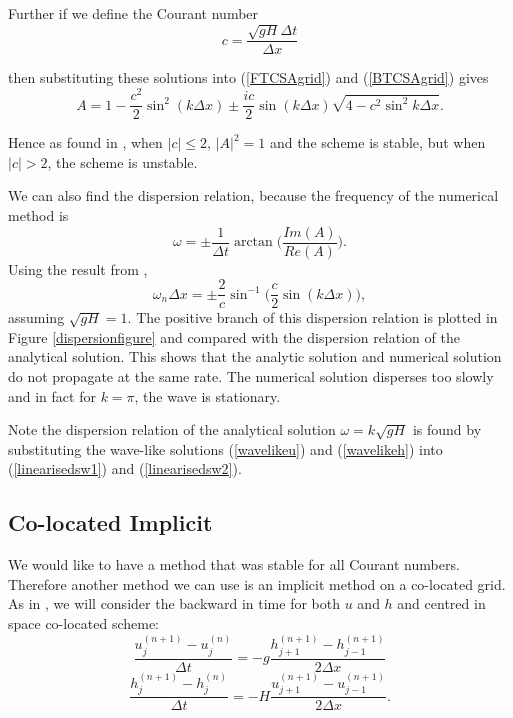 \documentclass[a4paper,12pt, notitlepage]{article}
\begin{document}
Further if we define the Courant number 
\begin{equation}\label{Courantnumber}
c = \frac{\sqrt{gH}\Delta t}{\Delta x}
\end{equation}

then substituting these solutions into (\ref{FTCSAgrid}) and (\ref{BTCSAgrid}) gives
\begin{equation}
A = 1 - \frac{c^{2}}{2} \sin^{2}(k\Delta x) \pm \frac{ic}{2}\sin(k\Delta x)\sqrt{4 - c^{2}\sin^{2}k\Delta x}.
\end{equation} 
 
Hence as found in \cite{MPE textbook}, when $\lvert c \rvert \leq 2$, $\lvert A \rvert^{2} = 1$ and the scheme is stable, but when $\lvert c \rvert > 2$, the scheme is unstable.
 
We can also find the dispersion relation, because the frequency of the numerical method is 
\begin{equation} \label{frequency}
\omega = \pm \frac{1}{\Delta t} \arctan\bigg(\frac{Im(A)}{Re(A)}\bigg).
\end{equation}
Using the result from \cite{MPE textbook}, 
\begin{equation}
\omega_{n}\Delta x = \pm \frac{2}{c} \sin^{-1} \bigg(\frac{c}{2}\sin(k\Delta x)\bigg),
\end{equation}
assuming $\sqrt{gH} = 1$. The positive branch of this dispersion relation is plotted in Figure \ref{dispersionfigure} and compared with the dispersion relation of the analytical solution. This shows that the analytic solution and numerical solution do not propagate at the same rate. The numerical solution disperses too slowly and in fact for $k = \pi$, the wave is stationary.

Note the dispersion relation of the analytical solution $\omega = k\sqrt{gH}$ is found by substituting the wave-like solutions (\ref{wavelikeu}) and (\ref{wavelikeh}) into (\ref{linearisedsw1}) and (\ref{linearisedsw2}). 

\subsection{Co-located Implicit}
We would like to have a method that was stable for all Courant numbers. Therefore another method we can use is an implicit method on a co-located grid. As in \cite{MPE textbook}, we will consider the backward in time for both $u$ and $h$ and centred in space co-located scheme:
\begin{equation} \label{FTimplicitAgrid1}
\frac{u_{j}^{(n+1)} - u_{j}^{(n)}}{\Delta t} = -g \frac{h_{j+1}^{(n+1)} - h_{j-1}^{(n+1)}}{2\Delta x}
\end{equation}
\begin{equation}\label{FTimplicitAgrid2}
\frac{h_{j}^{(n+1)} - h_{j}^{(n)}}{\Delta t} = -H \frac{u_{j+1}^{(n+1)} - u_{j-1}^{(n+1)}}{2\Delta x}.
\end{equation}
\end{document}
